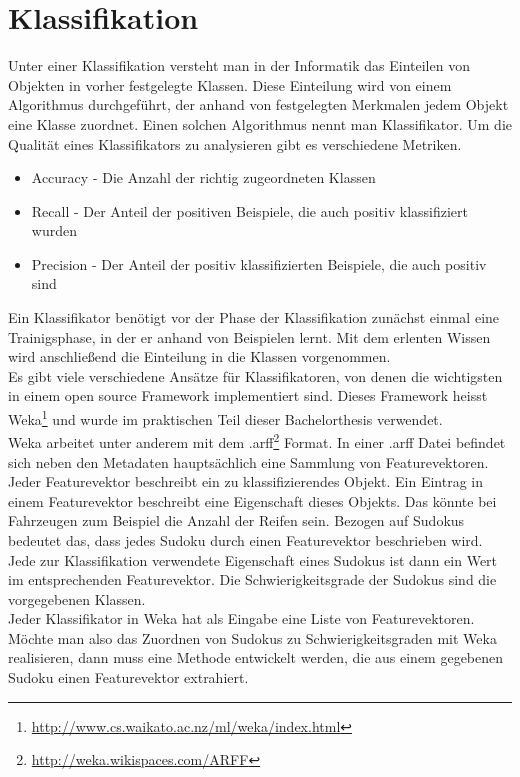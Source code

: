 \section{Klassifikation}
\label{Klassifikation}
Unter einer Klassifikation versteht man in der Informatik das Einteilen von Objekten in vorher festgelegte Klassen. Diese Einteilung wird von einem Algorithmus durchgeführt, der anhand von festgelegten Merkmalen jedem Objekt eine Klasse zuordnet. Einen solchen Algorithmus nennt man Klassifikator. Um die Qualität eines Klassifikators zu analysieren gibt es verschiedene Metriken.
\begin{itemize}
\item Accuracy - Die Anzahl der richtig zugeordneten Klassen
\item Recall - Der Anteil der positiven Beispiele, die auch positiv klassifiziert wurden
\item Precision - Der Anteil der positiv klassifizierten Beispiele, die auch positiv sind
\end{itemize}
Ein Klassifikator benötigt vor der Phase der Klassifikation zunächst einmal eine Trainigsphase, in der er anhand von Beispielen lernt. Mit dem erlenten Wissen wird anschließend die Einteilung in die Klassen vorgenommen.\\
Es gibt viele verschiedene Ansätze für Klassifikatoren, von denen die wichtigsten in einem open source Framework implementiert sind. Dieses Framework heisst Weka\footnote{\url{http://www.cs.waikato.ac.nz/ml/weka/index.html}} und wurde im praktischen Teil dieser Bachelorthesis verwendet.\\
Weka arbeitet unter anderem mit dem .arff\footnote{\url{http://weka.wikispaces.com/ARFF}} Format. In einer .arff Datei befindet sich neben den Metadaten hauptsächlich eine Sammlung von Featurevektoren. Jeder Featurevektor beschreibt ein zu klassifizierendes Objekt. Ein Eintrag in einem Featurevektor beschreibt eine Eigenschaft dieses Objekts. Das könnte bei Fahrzeugen zum Beispiel die Anzahl der Reifen sein. Bezogen auf Sudokus bedeutet das, dass jedes Sudoku durch einen Featurevektor beschrieben wird. Jede zur Klassifikation verwendete Eigenschaft eines Sudokus ist dann ein Wert im entsprechenden Featurevektor. Die Schwierigkeitsgrade der Sudokus sind die vorgegebenen Klassen.\\
Jeder Klassifikator in Weka hat als Eingabe eine Liste von Featurevektoren. Möchte man also das Zuordnen von Sudokus zu Schwierigkeitsgraden mit Weka realisieren, dann muss eine Methode entwickelt werden, die aus einem gegebenen Sudoku einen Featurevektor extrahiert.\\
